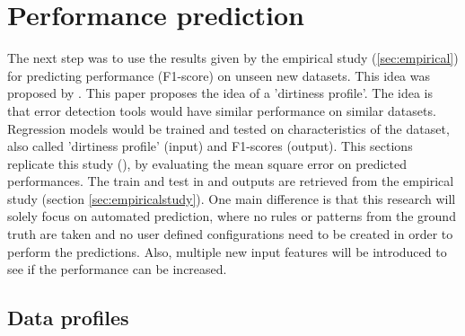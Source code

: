 
\section{Performance prediction}
\label{sec:performanceprediction}
The next step was to use the results given by the empirical study (\ref{sec:empirical}) for predicting performance (F1-score) on unseen new datasets. This idea was proposed by \cite{Mahdavi2019-pk}. This paper proposes the idea of a 'dirtiness profile'. The idea is that error detection tools would have similar performance on similar datasets. Regression models would be trained and tested on characteristics of the dataset, also called 'dirtiness profile' (input) and F1-scores (output). This sections replicate this study (\cite{Mahdavi2019-pk}), by evaluating the mean square error on predicted performances. The train and test in and outputs are retrieved from the empirical study (section \ref{sec:empiricalstudy}). One main difference is that this research will solely focus on automated prediction, where no rules or patterns from the ground truth are taken and no user defined configurations need to be created in order to perform the predictions. Also, multiple new input features will be introduced to see if the performance can be increased. 

\subsection{Data profiles}
\label{subsec:dataprofiles}
